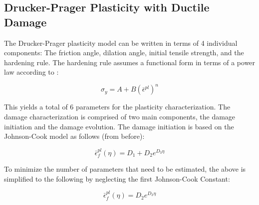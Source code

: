 \subsection{Drucker-Prager Plasticity with Ductile Damage}

The Drucker-Prager plasticity model can be written in terms of 4 individual
components: The friction angle, dilation angle, initial tensile strength,
and the hardening rule. The hardening rule assumes a functional form
in terms of a power law according to \cite{prantl_identification_2013}:

\begin{equation}
\sigma_{y}=A+B\left(\bar{\epsilon}^{pl}\right)^{n}\label{eqn:dparam5}
\end{equation}

This yields a total of 6 parameters for the plasticity characterization.
The damage characterization is comprised of two main components, the
damage initiation and the damage evolution. The damage initiation
is based on the Johnson-Cook model as follows (from before):

\begin{equation}
\bar{\epsilon}_{f}^{pl}\left(\eta\right)=D_{1}+D_{2}e^{D_{3}\eta}\label{eqn:dparam6}
\end{equation}


To minimize the number of parameters that need to be estimated, the
above is simplified to the following by neglecting the first Johnson-Cook
Constant:

\begin{equation}
\bar{\epsilon}_{f}^{pl}\left(\eta\right)=D_{2}e^{D_{3}\eta}\label{eqn:dparam6-1}
\end{equation}

